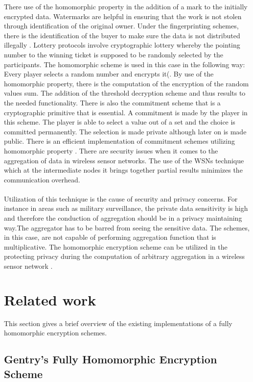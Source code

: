 There use of the homomorphic property in the addition of a mark to the initially encrypted data. Watermarks are helpful in ensuring that the work is not stolen through identification of the original owner. Under the fingerprinting schemes, there is the identification of the buyer to make sure the data is not distributed illegally \cite{sen2013homomorphic}.
Lottery protocols involve cryptographic lottery whereby the pointing number to the winning ticket is supposed to be randomly selected by the participants. The homomorphic scheme is used in this case in the following way: Every player selects a random number and encrypts it(\cite{sen2013homomorphic}. By use of the homomorphic property, there is the computation of the encryption of the random values sum. The addition of the threshold decryption scheme and thus results to the needed functionality.
\newpage
There is also the commitment scheme that is a cryptographic primitive that is essential. A commitment is made by the player in this scheme. The player is able to select a value out of a set and the choice is committed permanently. The selection is made private although later on is made public. There is an efficient implementation of commitment schemes utilizing homomorphic property \cite{sen2013homomorphic}.
There are security issues when it comes to the aggregation of data in wireless sensor networks. The use of the WSNs technique which at the intermediate nodes it brings together partial results minimizes the communication overhead. \\\\
Utilization of this technique is the cause of security and privacy concerns. For instance in areas such as military surveillance, the private data sensitivity is high and therefore the conduction of aggregation should be in a privacy maintaining way.The aggregator has to be barred from seeing the sensitive data. The schemes, in this case, are not capable of performing aggregation function that is multiplicative. The homomorphic encryption scheme can be utilized in the protecting privacy during the computation of arbitrary aggregation in a wireless sensor network \cite{sen2013homomorphic}.

\section{Related work}
This section gives a brief overview of the existing implementations of a fully homomorphic encryption schemes.

\subsection{Gentry's Fully Homomorphic Encryption Scheme}
